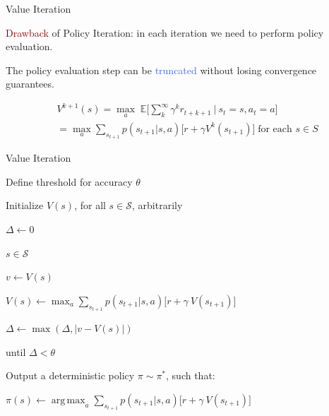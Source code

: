\documentclass{beamer}
\DeclareMathOperator*{\argmax}{arg\,max}
\begin{document}
\begin{frame}{Value Iteration}

\textcolor{Maroon}{Drawback} of Policy Iteration: in each iteration we need to perform policy evaluation.

\vspace{2mm}

The policy evaluation step can be \textcolor{RoyalBlue}{truncated} without losing convergence guarantees.

\begin{align*}
    &V^{k+1}(s) = \max_a \;  \mathds{E} \bigg[\sum_{k}^{\infty}\gamma^{k} r_{t+k+1} \: \bigg| \: s_t=s, a_t = a \bigg] \\
		   & = \max_a \sum_{s_{t+1}} p(s_{t+1}|s,a)\big[r + \gamma V^{k}(s_{t+1}) \big] \; \text{for each } s \in S
\end{align*}


\end{frame}


\begin{frame}{Value Iteration}


\begin{algorithm}[H]
\caption{Value Iteration Algorithm}


\vspace{1mm}

Define threshold for accuracy $\theta$

Initialize $V(s)$, for all $s \in \mathcal{S}$, arbitrarily

\vspace{4mm}

 $\Delta \leftarrow 0$

 \textbf{}  \textbf{}
 
 \vspace{0.5mm}
 
 \hspace{6mm} \textbf{}  $s \in \mathcal{S}$ \textbf{}
 
   
   \hspace{15mm} $v \leftarrow V(s)$
   
   \hspace{15mm} $V(s) \leftarrow \max_a \sum_{s_{t+1}}p(s_{t+1}|s,a)\Big[r+\gamma\:V(s_{t+1})\Big]$
   
   \hspace{15mm} $\Delta \leftarrow \max(\Delta, |v - V(s)|)$
   
   until $\Delta < \theta$

   \vspace{4mm}

   Output a deterministic policy $\pi \sim \pi^{*}$, such that:
   
   $\pi(s) \leftarrow \argmax_a \sum_{s_{t+1}}p(s_{t+1}|s,a)\Big[r+\gamma\:V(s_{t+1})\Big]$
   

\end{algorithm}

\end{frame}
\end{document}
